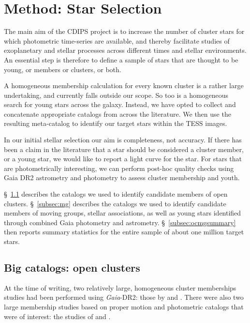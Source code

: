 \documentclass[12pt,twocolumn,tighten]{aastex62}
\begin{document}
\section{Method: Star Selection}
\label{sec:starselection}

The main aim of the CDIPS project is to increase the number of cluster
stars for which photometric time-series are available, and thereby
facilitate studies of exoplanetary and stellar processes across
different times and stellar environments.  An essential step is
therefore to define a sample of stars that are thought to be young, or
members or clusters, or both.

A homogeneous membership calculation for every known cluster is a
rather large undertaking, and currently falls outside our scope.  So
too is a homogeneous search for young stars across the galaxy.
Instead, we have opted to collect and concatenate appropriate catalogs
from across the literature.  We then use the resulting meta-catalog to
identify our target stars within the TESS images.

In our initial stellar selection our aim is completeness, not
accuracy.  If there has been a claim in the literature that a star
should be considered a cluster member, or a young star, we would like
to report a light curve for the star.  For stars that are
photometrically interesting, we can perform post-hoc quality checks
using Gaia DR2 astrometry and photometry to assess cluster membership
and youth.

\S~\ref{subsec:oc} describes the catalogs we used to identify
candidate members of open clusters.  \S~\ref{subsec:mg} describes the
catalogs we used to identify candidate members of moving groups,
stellar associations, as well as young stars identified through
combined Gaia photometry and astrometry.  \S~\ref{subsec:ocmgsummary}
then reports summary statistics for the entire sample of about one
million target stars.


\subsection{Big catalogs: open clusters}
\label{subsec:oc}

At the time of writing, two relatively large, homogeneous cluster
memberships studies had been performed using {\it Gaia}-DR2: those by
\citet{cantat-gaudin_gaia_2018} and \citet{gaia_hr_2018}.
There were also two large membership studies based on proper motion and 
photometric catalogs that were of interest: the studies of
\citet{Kharchenko_et_al_2013} and \citet{dias_proper_2014}.
\end{document}
